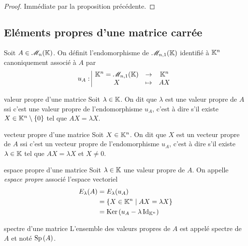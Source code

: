 \begin{proof}
    Immédiate par la proposition précédente. 
\end{proof}

\subsection{Eléments propres d'une matrice carrée }

\begin{definition}{}{}
    Soit $A \in \mathscr M_n(\mathbb{K})$. On définit l'endomorphisme de $\mathscr M_{n, 1}(\mathbb{K})$
    identifié à $\mathbb{K}^n$ canoniquement associé à $A$ par 
    $$u_A: \space \begin{array}{|ccc} \displaystyle \mathbb{K}^n = \mathscr M_{n, 1}(\mathbb{K}) & \to & \displaystyle \mathbb{K}^n \\ \displaystyle X & \mapsto & \displaystyle AX \end{array}$$
\end{definition}

\begin{definition}{valeur propre d'une matrice}{}
    Soit $\lambda \in \mathbb{K}$. On dit que $\lambda$ est une valeur propre de $A$ ssi
    c'est une valeur propre de l'endomorphisme $u_A$, c'est à dire s'il existe 
    $X \in \mathbb{K}^n \setminus \{0\}$ tel que $AX = \lambda X$.
\end{definition}

\begin{definition}{vecteur propre d'une matrice}{}
    Soit $X \in \mathbb{K}^n$. On dit que $X$ est un vecteur propre de $A$ ssi
    c'est un vecteur propre de l'endomorphisme $u_A$, c'est à dire s'il existe 
    $\lambda \in \mathbb{K}$ tel que $AX = \lambda X$ et $X \neq 0$.
\end{definition}

\begin{definition}{espace propre d'une matrice}{}
    Soit $\lambda \in \mathbb{K}$ une valeur propre de $A$. On appelle \emph{espace propre} 
    associé l'espace vectoriel 
    \begin{align} E_\lambda(A) & = E_\lambda(u_A) \\
                        & = \{ X \in \mathbb{K}^n \mid AX = \lambda X \} \\
                        & = \operatorname{Ker} \, (u_A - \lambda \operatorname{Id}_{\mathbb{K}^n}) 
    \end{align}
\end{definition}

\begin{definition}{spectre d'une matrice}{}
    L'ensemble des valeurs propres de $A$ est appelé spectre de $A$ 
    et noté $\operatorname{Sp} \,(A)$.
    
\end{definition}

